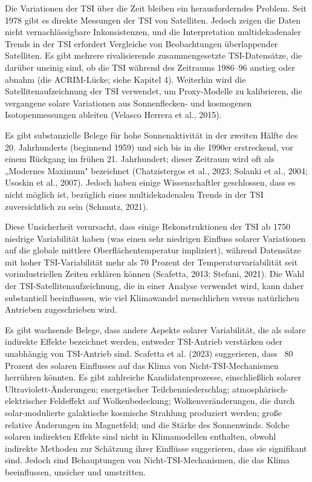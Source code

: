 \documentclass[12pt,paper=a4,DIV=12,parskip=never,chapterprefix=false,headings=standardclasses]{scrreprt}
\begin{document}
Die Variationen der TSI über die Zeit bleiben ein herausforderndes Problem. Seit 1978 gibt es direkte Messungen der TSI von Satelliten. Jedoch zeigen die Daten nicht vernachlässigbare Inkonsistenzen, und die Interpretation multidekadenaler Trends in der TSI erfordert Vergleiche von Beobachtungen überlappender Satelliten. Es gibt mehrere rivalisierende zusammengesetzte TSI-Datensätze, die darüber uneinig sind, ob die TSI während des Zeitraums 1986–96 anstieg oder abnahm (die ACRIM-Lücke; siehe Kapitel 4). Weiterhin wird die Satellitenaufzeichnung der TSI verwendet, um Proxy-Modelle zu kalibrieren, die vergangene solare Variationen aus Sonnenflecken- und kosmogenen Isotopenmessungen ableiten (Velasco Herrera et al., 2015).

Es gibt substanzielle Belege für hohe Sonnenaktivität in der zweiten Hälfte des 20. Jahrhunderts (beginnend 1959) und sich bis in die 1990er erstreckend, vor einem Rückgang im frühen 21. Jahrhundert; dieser Zeitraum wird oft als „Modernes Maximum" bezeichnet (Chatzistergos et al., 2023; Solanki et al., 2004; Usoskin et al., 2007). Jedoch haben einige Wissenschaftler geschlossen, dass es nicht möglich ist, bezüglich eines multidekadenalen Trends in der TSI zuversichtlich zu sein (Schmutz, 2021).

Diese Unsicherheit verursacht, dass einige Rekonstruktionen der TSI ab 1750 niedrige Variabilität haben (was einen sehr niedrigen Einfluss solarer Variationen auf die globale mittlere Oberflächentemperatur impliziert), während Datensätze mit hoher TSI-Variabilität mehr als 70 Prozent der Temperaturvariabilität seit vorindustriellen Zeiten erklären können (Scafetta, 2013; Stefani, 2021). Die Wahl der TSI-Satellitenaufzeichnung, die in einer Analyse verwendet wird, kann daher substantiell beeinflussen, wie viel Klimawandel menschlichen versus natürlichen Antrieben zugeschrieben wird.

Es gibt wachsende Belege, dass andere Aspekte solarer Variabilität, die als solare indirekte Effekte bezeichnet werden, entweder TSI-Antrieb verstärken oder unabhängig von TSI-Antrieb sind. Scafetta et al. (2023) suggerieren, dass ~80 Prozent des solaren Einflusses auf das Klima von Nicht-TSI-Mechanismen herrühren könnten. Es gibt zahlreiche Kandidatenprozesse, einschließlich solarer Ultraviolett-Änderungen; energetischer Teilchenniederschlag; atmosphärisch-elektrischer Feldeffekt auf Wolkenbedeckung; Wolkenveränderungen, die durch solar-modulierte galaktische kosmische Strahlung produziert werden; große relative Änderungen im Magnetfeld; und die Stärke des Sonnenwinds. Solche solaren indirekten Effekte sind nicht in Klimamodellen enthalten, obwohl indirekte Methoden zur Schätzung ihrer Einflüsse suggerieren, dass sie signifikant sind. Jedoch sind Behauptungen von Nicht-TSI-Mechanismen, die das Klima beeinflussen, unsicher und umstritten.
\end{document}
